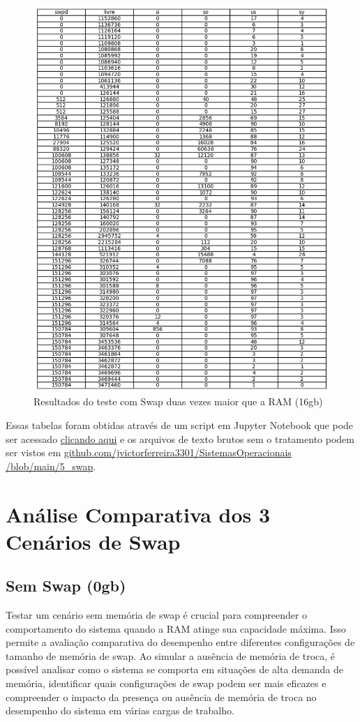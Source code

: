 \documentclass[
	12pt,				%
	openright,			%
	oneside,			%
	a4paper,			%
	chapter=TITLE,		%
	english,			%
	french,				%
	spanish,			%
	brazil				%
	]{abntex2}
\theoremstyle{definition}
\begin{document}
\begin{figure}[H]
	\centering
	\includegraphics[width=1.0\textwidth]{swap16gb.png}
	\caption{Resultados do teste com Swap duas vezes maior que a RAM (16gb)}
	\label{fig:swap16}
\end{figure}

Essas tabelas foram obtidas através de um script em Jupyter Notebook que pode ser acessado 
\href{https://github.com/jvictorferreira3301/Sistemas_Operacionais/blob/main/5_swap/swap.sh}{clicando aqui} 
e os arquivos de texto brutos sem o tratamento podem ser vistos em  \href{https://github.com/jvictorferreira3301/Sistemas_Operacionais/blob/main/5_swap}{github.com/jvictorferreira3301/SistemasOperacionais
/blob/main/5\_swap}.

\section{Análise Comparativa dos 3 Cenários de Swap}
\subsection{Sem Swap (0gb)}
Testar um cenário sem memória de swap é crucial para compreender o comportamento do sistema quando a RAM atinge sua capacidade máxima. 
Isso permite a avaliação comparativa do desempenho entre diferentes configurações de tamanho de memória de swap. Ao simular a ausência de memória de troca,
é possível analisar como o sistema se comporta em situações de alta demanda de memória, identificar quais configurações de swap podem ser mais
eficazes e compreender o impacto da presença ou ausência de memória de troca no desempenho do sistema em várias cargas de trabalho.
\end{document}
